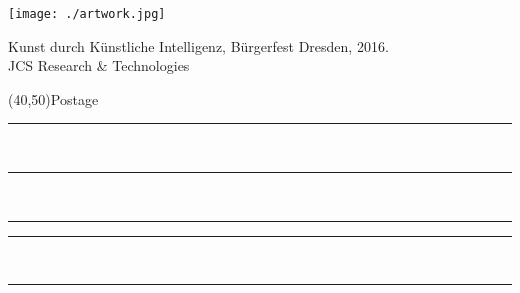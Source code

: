 \documentclass[a6paper,landscape,7pt]{scrartcl}
\begin{document}
\begin{center}
	\texttt{[image: ./artwork.jpg]}
\end{center}


\begin{multicols}{2}
    Kunst durch Künstliche Intelligenz, Bürgerfest Dresden, 2016.\\
    {\small JCS Research \& Technologies}
    \columnbreak\par
    \hfill\framebox(40,50){\scriptsize Postage}\par
    \vspace{0.25\textheight}
    \rule{5.8cm}{0.01cm}\vspace*{1cm}\\ %
    \rule{5.8cm}{0.01cm}\vspace*{1cm}\\ %
    \rule{2.2cm}{0.01cm}\hspace*{0.2cm}\rule{3.4cm}{0.01cm}\vspace*{1cm}\\ %
    \rule{5.8cm}{0.01cm}\\ %
\end{multicols} 
\end{document}
